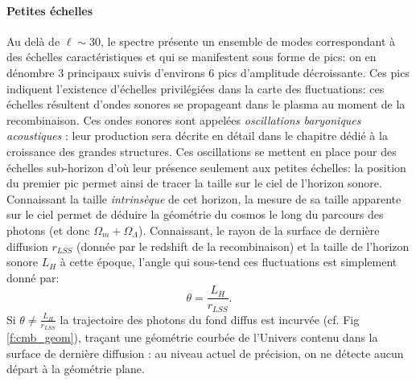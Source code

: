 \paragraph{Petites échelles} Au delà de $\ell\sim 30$, le spectre présente un ensemble de modes correspondant à des échelles caractéristiques et qui se manifestent sous forme de pics: on en dénombre 3 principaux suivis d'environs 6 pics d'amplitude décroissante. Ces pics indiquent l'existence d'échelles privilégiées dans la carte des fluctuations: ces échelles résultent d'ondes sonores se propageant dans le plasma au moment de la recombinaison. Ces ondes sonores sont appelées \textit{oscillations baryoniques acoustiques}  : leur production sera décrite en détail dans le chapitre dédié à la croissance des grandes structures. Ces oscillations se mettent en place pour des échelles sub-horizon d'où leur présence seulement aux petites échelles: la position du premier pic permet ainsi de tracer la taille sur le ciel de l'horizon sonore. Connaissant la taille \textit{intrinsèque} de cet horizon, la mesure de sa taille apparente sur le ciel permet de déduire la géométrie du cosmos le long du parcours des photons (et donc $\Omega_m+\Omega_\Lambda$). Connaissant, le rayon de la surface de dernière diffusion $r_{LSS}$ (donnée par le redshift de la recombinaison) et la taille de l'horizon  sonore $L_H$ à cette époque, l'angle qui sous-tend ces fluctuations est simplement donné par:
\begin{equation}
\theta=\frac{L_H}{r_{LSS}}.
\end{equation}
Si $\theta \neq \frac{L_H}{r_{LSS}}$ la trajectoire des photons du fond diffus est incurvée (cf. Fig \ref{f:cmb_geom}), traçant une géométrie courbée de l'Univers contenu dans la surface de dernière diffusion : au niveau actuel de précision, on ne détecte aucun départ à la géométrie plane.
